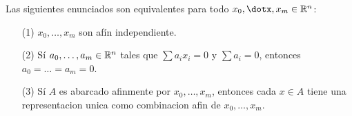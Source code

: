 \begin{theorem}\label{10.26}
    Las siguientes enunciados son equivalentes para todo $x_0, \dotx, x_m \in
    \R^n$:
    \begin{enumerate}
        \item[(1)] $x_0, \dots, x_m$ son af\'in independiente.

        \item[(2)] S\'i $a_0, \dots, a_m \in \mathbb{R}^n$ tales que $\sum{a_ix_i}=0$ y
            $\sum{a_i}=0$, entonces $a_0=\dots=a_m=0$.

        \item[(3)] S\'i  $A$ es abarcado afinmente por  $x_0, \dots, x_m$,
            entonces cada $x \in A$ tiene una representacion unica como
            combinacion afin de  $x_0, \dots, x_m$.
    \end{enumerate}
\end{theorem}
